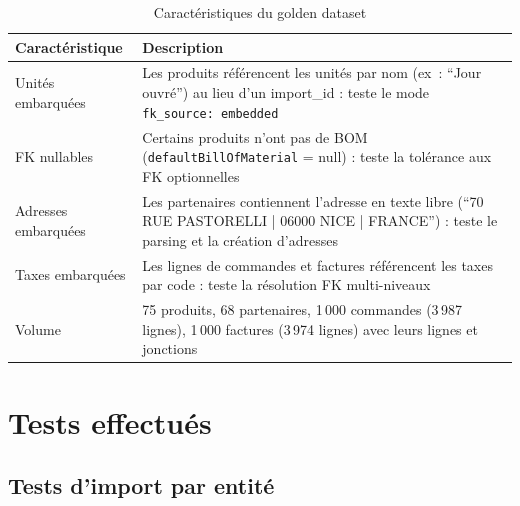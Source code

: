 \begin{table}[H]
  \centering
  \renewcommand{\arraystretch}{1.4}
  \begin{tabular}{p{4cm} p{9cm}}
    \toprule
    \rowcolor{gray!20}
    \textbf{Caractéristique} & \textbf{Description} \\
    \midrule
    \rowcolor{gray!5}
    Unités embarquées   & Les produits référencent les unités par nom (ex~: ``Jour ouvré'') au lieu d'un import\_id : teste le mode \texttt{fk\_source: embedded} \\
    FK nullables        & Certains produits n'ont pas de BOM (\texttt{defaultBillOfMaterial} = null) : teste la tolérance aux FK optionnelles \\
    \rowcolor{gray!5}
    Adresses embarquées & Les partenaires contiennent l'adresse en texte libre (``70 RUE PASTORELLI | 06000 NICE | FRANCE'') : teste le parsing et la création d'adresses \\
    Taxes embarquées    & Les lignes de commandes et factures référencent les taxes par code : teste la résolution FK multi-niveaux \\
    \rowcolor{gray!5}
    Volume              & 75 produits, 68 partenaires, 1\,000 commandes (3\,987 lignes), 1\,000 factures (3\,974 lignes) avec leurs lignes et jonctions \\
    \bottomrule
  \end{tabular}
  \caption{Caractéristiques du golden dataset}
  \label{tab:golden-dataset}
\end{table}

\clearpage
\section{Tests effectués}

\subsection{Tests d'import par entité}

